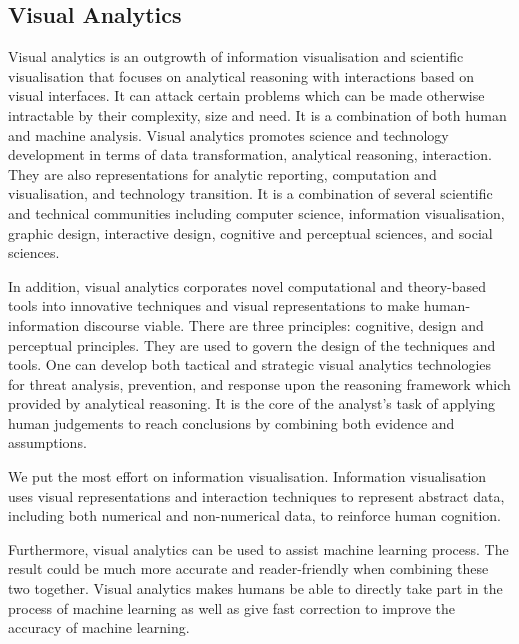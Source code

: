 \subsection{Visual Analytics}
Visual analytics is an outgrowth of information visualisation and scientific visualisation that focuses on analytical reasoning with interactions based on visual interfaces\cite{VisualAnalytics2004}. It can attack certain problems which can be made otherwise intractable by their complexity, size and need. It is a combination of both human and machine analysis. Visual analytics promotes science and technology development in terms of data transformation, analytical reasoning, interaction\cite{tory2004human,VisualAnalytics2004,andrienko2007visual}. They are also representations for analytic reporting, computation and visualisation, and technology transition\cite{VisualAnalytics2004}. It is a combination of several scientific and technical communities including computer science, information visualisation, graphic design, interactive design, cognitive and perceptual sciences, and social sciences.

In addition, visual analytics corporates novel computational and theory-based tools into innovative techniques and visual representations to make human-information discourse viable\cite{VisualAnalytics2004}. There are three principles: cognitive, design and perceptual principles. They are used to govern the design of the techniques and tools\cite{VisualAnalytics2004}. One can develop both tactical and strategic visual analytics technologies for threat analysis, prevention, and response upon the reasoning framework which provided by analytical reasoning\cite{tory2004human,VisualAnalytics2004}. It is the core of the analyst's task of applying human judgements to reach conclusions by combining both evidence and assumptions.

We put the most effort on information visualisation. Information visualisation uses visual representations and interaction techniques to represent abstract data, including both numerical and non-numerical data, to reinforce human cognition\cite{andrienko2007visual}.

Furthermore, visual analytics can be used to assist machine learning process. The result could be much more accurate and reader-friendly when combining these two together. Visual analytics makes humans be able to directly take part in the process of machine learning as well as give fast correction to improve the accuracy of machine learning\cite{andrienko2007visual}.



